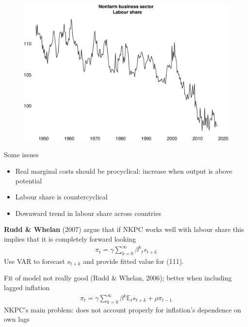 \documentclass{beamer}
\begin{document}
\begin{frame}
  \begin{figure}
    \includegraphics[scale=.25]{labour_share.eps}
  \end{figure}
\end{frame}

\begin{frame}
Some issues
  \begin{itemize}    
    \item Real marginal costs should be procyclical: increase when output is above potential
    \item Labour share is countercyclical
    \item Downward trend in labour share across countries
  \end{itemize}
  \medskip
\textbf{Rudd \& Whelan} (2007) argue that if NKPC works well with labour share this implies that it is completely forward looking
\begin{align}
  \pi_t = \gamma \sum_{k=0}^{\infty} \beta^k \mathbb{}_t s_{t+k}
\end{align}
\medskip
Use VAR to forecast $s_{t+k}$ and provide fitted value for (111).
\end{frame}

\begin{frame}
 Fit of model not really good (Rudd \& Whelan, 2006); better when including lagged inflation
\begin{align}
  \pi_t = \gamma \sum_{k=0}^{\infty} \beta^k \mathbb{E}_t s_{t+k} + \rho \pi_{t-1}
\end{align}
NKPC's main problem: does not account properly for inflation's dependence on own lags
\end{frame}
\end{document}
